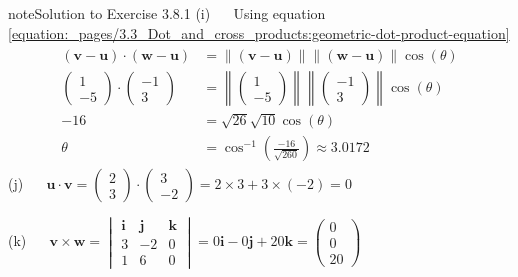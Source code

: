 \documentclass[letterpaper,10pt,english]{jupyterBook}
\begin{document}
\begin{sphinxadmonition}{note}{Solution to Exercise 3.8.1}
\sphinxAtStartPar
(i)   Using equation \eqref{equation:_pages/3.3_Dot_and_cross_products:geometric-dot-product-equation}
\begin{equation*}
\begin{split} \begin{align*}
    (\mathbf{v} - \mathbf{u}) \cdot (\mathbf{w} - \mathbf{u}) &= \|(\mathbf{v} - \mathbf{u})\|\|(\mathbf{w} - \mathbf{u})\| \cos(\theta) \\
    \begin{pmatrix} 1 \\ -5 \end{pmatrix} \cdot \begin{pmatrix} -1 \\ 3 \end{pmatrix} &=
    \left\| \begin{pmatrix} 1 \\ -5 \end{pmatrix} \right\|
    \left\| \begin{pmatrix} -1 \\ 3 \end{pmatrix} \right\| \cos(\theta) \\
    -16 &= \sqrt{26} \sqrt{10} \cos(\theta) \\
    \theta &= \cos^{-1} \left( \frac{-16}{\sqrt{260}} \right) \approx 3.0172
\end{align*} \end{split}
\end{equation*}
\sphinxAtStartPar
(j)   \(\mathbf{u} \cdot \mathbf{v} = \begin{pmatrix} 2 \\ 3 \end{pmatrix} \cdot \begin{pmatrix} 3 \\ -2 \end{pmatrix} = 2 \times 3 + 3 \times (-2) = 0\)

\sphinxAtStartPar
(k)   \(\mathbf{v} \times \mathbf{w} = \begin{vmatrix} \mathbf{i} & \mathbf{j} & \mathbf{k} \\ 3 & -2 & 0 \\ 1 & 6 & 0 \end{vmatrix} = 0\mathbf{i} - 0 \mathbf{j} + 20 \mathbf{k} = \begin{pmatrix} 0 \\ 0 \\ 20 \end{pmatrix}\)
\end{sphinxadmonition}
 \label{_pages/A3_Vectors_exercises_solutions:_pages/A3_Vectors_exercises_solutions-solution-1}
\end{document}
